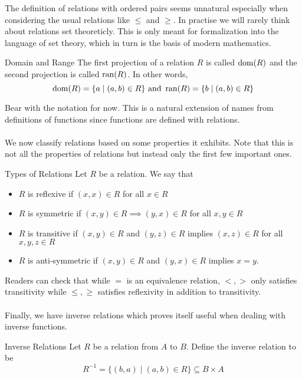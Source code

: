 \documentclass[a4paper]{article}
\begin{document}
The definition of relations with ordered pairs seems unnatural especially when considering the usual relations like $\leq$ and $\geq$. In practise we will rarely think about relations set theoreticly. This is only meant for formalization into the language of set theory, which in turn is the basis of modern mathematics. 

\begin{defn}{Domain and Range}{} The first projection of a relation $R$ is called $\operatorname{dom}(R)$ and the second projection is called $\operatorname{ran}(R)$. In other words, $$\operatorname{dom}(R)=\{a\;|\;(a,b)\in R\}\text{  and  }\operatorname{ran}(R)=\{b\;|\;(a,b)\in R\}$$
\end{defn}

Bear with the notation for now. This is a natural extension of names from definitions of functions since functions are defined with relations. \\~\\

We now classify relations based on some properties it exhibits. Note that this is not all the properties of relations but instead only the first few important ones. 

\begin{defn}{Types of Relations}{} Let $R$ be a relation. We say that 
\begin{itemize}
\item $R$ is reflexive if $(x,x)\in R$ for all $x\in R$
\item $R$ is symmetric if $(x,y)\in R\implies (y,x)\in R$ for all $x,y\in R$
\item $R$ is transitive if $(x,y)\in R$ and $(y,z)\in R$ implies $(x,z)\in R$ for all $x,y,z\in R$
\item $R$ is anti-symmetric if $(x,y)\in R$ and $(y,x)\in R$ implies $x=y$. 
\end{itemize}
\end{defn}

Readers can check that while $=$ is an equivalence relation, $<,>$ only satisfies transitivity while $\leq,\geq$ satisfies reflexivity in addition to transitivity. \\~\\

Finally, we have inverse relations which proves itself useful when dealing with inverse functions. 

\begin{defn}{Inverse Relations}{} Let $R$ be a relation from $A$ to $B$. Define the inverse relation to be $$R^{-1}=\{(b,a)\;|\;(a,b)\in R\}\subseteq B\times A$$
\end{defn}
\end{document}
